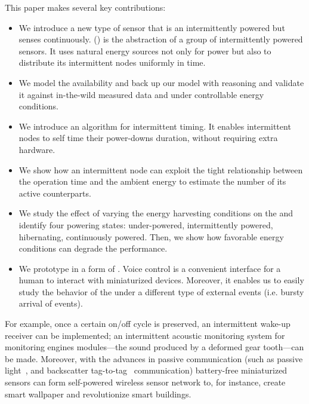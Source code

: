 This paper makes several key contributions:
\begin{itemize}
		\item We introduce a new type of sensor that is an intermittently powered but senses continuously. \textit{\fullsys} (\sys) is the abstraction of a group of intermittently powered sensors. It uses natural energy sources not only for power but also to distribute its intermittent nodes uniformly in time.
		\item We model the \sys availability and back up our model with reasoning and validate it against in-the-wild measured data and under controllable energy conditions.   
		\item We introduce an algorithm for intermittent timing. It enables intermittent nodes to self time their power-downs duration, without requiring extra hardware. 
		\item We show how an intermittent node can exploit the tight relationship between the operation time and the ambient energy to estimate the number of its active counterparts.
		\item We study the effect of varying the energy harvesting conditions on the \sys and identify four \sys powering states: under-powered, intermittently powered, hibernating, continuously powered. Then, we show how favorable energy conditions can degrade the \sys performance.
		\item We prototype \fullsys in a form of \fullcim. Voice control is a convenient interface for a human to interact with miniaturized devices. Moreover, it enables us to easily study the behavior of the \sys under a different type of external events (i.e. bursty arrival of events). 
\end{itemize}

 For example, once a certain on/off cycle is preserved, an intermittent wake-up receiver can be implemented; an intermittent acoustic monitoring system for monitoring engines modules---the sound produced by a deformed gear tooth---can be made. Moreover, with the advances in passive communication (such as passive light~\cite{}, and backscatter tag-to-tag~\cite{liu2013ambient} communication) battery-free miniaturized sensors can form self-powered wireless sensor network to, for instance, create smart wallpaper and revolutionize smart buildings. 

